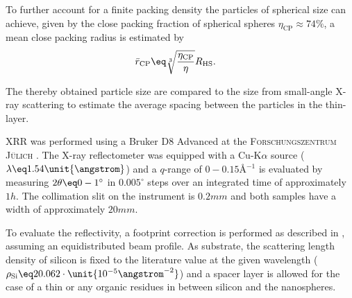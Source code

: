 \documentclass[\main/dresen_thesis.tex]{subfiles}
\begin{document}
    To further account for a finite packing density the particles of spherical size can achieve, given by the close packing fraction of spherical spheres $\eta_\mathrm{CP} \approx 74 \%$, a mean close packing radius is estimated by
    \begin{align}
      \begin{split}
        \label{eq:looselyPackedNP:layers:wignerSeitzClosePacking}
        \bar{r}_\mathrm{CP}       &\eq \sqrt[3]{\frac{\eta_\mathrm{CP}}{\eta}}R_\mathrm{HS}.
      \end{split}
    \end{align}

    The thereby obtained particle size are compared to the size from small-angle X-ray scattering to estimate the average spacing between the particles in the thin-layer.

    XRR was performed using a Bruker D8 Advanced at the \textsc{Forschungszentrum J\"ulich} .
    The X-ray reflectometer was equipped with a Cu-K$\alpha$ source ($\lambda \eq 1.54 \unit{\angstrom}$) and a $q$-range of $0 - 0.15 \unit{\angstrom^{-1}}$ is evaluated by measuring $2 \theta \eq 0 - 1 ^\circ$ in $0.005 ^\circ$ steps over an integrated time of approximately $1 \unit{h}$.
    The collimation slit on the instrument is $0.2 \unit{mm}$ and both samples have a width of approximately $20 \unit{mm}$.

    To evaluate the reflectivity, a footprint correction is performed as described in , assuming an equidistributed beam profile.
    As substrate, the scattering length density of silicon is fixed to the literature value at the given wavelength ($\rho_\mathrm{Si} \eq 20.062 \cdot \unit{10^{-5} \angstrom^{-2}}$) and a spacer layer is allowed for the case of a thin  or any organic residues in between silicon and the nanospheres.
\end{document}
